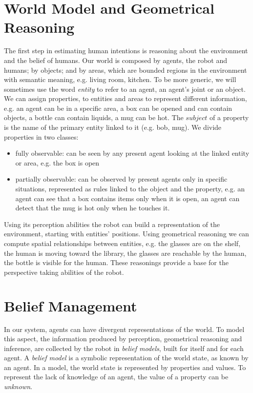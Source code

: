 
\section{World Model and Geometrical Reasoning}
\label{sec:situation_assessment-situation_assessment}
The first step in estimating human intentions is reasoning about the environment and the belief of humans. Our world is composed by agents, the robot and humans; by objects; and by areas, which are bounded regions in the environment with semantic meaning, e.g. living room, kitchen. To be more generic, we will sometimes use the word \textit{entity} to refer to an agent, an agent's joint or an object. We can assign properties, to entities and areas to represent different information, e.g. 
an agent can be in a specific area, a box can be opened and can contain objects, a bottle can contain liquids, a mug can be hot. The $subject$ of a property is the name of the primary entity linked to it (e.g. bob, mug). 
 We divide properties in two classes: 
\begin{itemize}
\item fully observable:  can be seen by any present agent looking at the linked entity or area, e.g. the box is open
\item partially observable: can be observed by present agents only in specific situations, represented as rules linked to the object and the property, e.g. an agent can see that a box contains items only when it is open, an agent can detect that the mug is hot only when he touches it.
\end{itemize}

Using its perception abilities the robot can build a representation of the environment, starting with entities' positions. Using geometrical reasoning we can compute spatial relationships between entities, e.g. the glasses are on the shelf, the human is moving toward the library, the glasses are reachable by the human, the bottle is visible for the human. These reasonings provide a base for the perspective taking abilities of the robot. 



\section{Belief Management}
\label{sec:situation_assessment-belief_management}
In our system, agents can have divergent representations of the world. To model this aspect, the information produced by perception, geometrical reasoning and inference, are collected by the robot in \textit{belief models}, built for itself and for each agent. A \textit{belief model} is a symbolic representation of the world state, as known by an agent. In a model, the world state is represented by properties and values. To represent the lack of knowledge of an agent, the value of a property can be \textit{unknown}.

